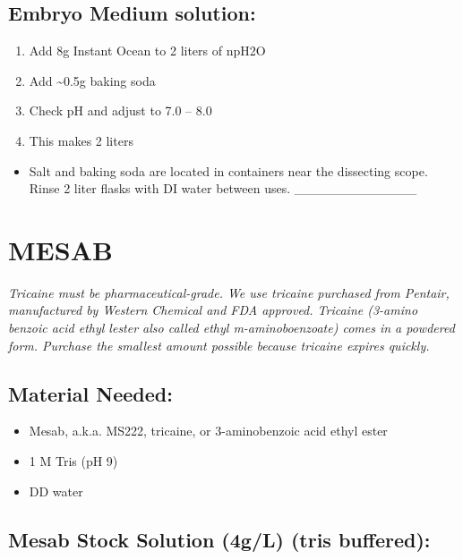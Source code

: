 \documentclass[
]{book}
\providecommand{\tightlist}{%
  \setlength{\itemsep}{0pt}\setlength{\parskip}{0pt}}
\begin{document}
\hypertarget{embryo-medium-solution}{%
\subsection{Embryo Medium solution:}\label{embryo-medium-solution}}

\begin{enumerate}
\def\labelenumi{\arabic{enumi}.}
\tightlist
\item
  Add 8g Instant Ocean to 2 liters of npH2O
\item
  Add \textasciitilde0.5g baking soda
\item
  Check pH and adjust to 7.0 -- 8.0
\item
  This makes 2 liters
\end{enumerate}

\begin{itemize}
\tightlist
\item
  Salt and baking soda are located in containers near the dissecting scope. Rinse 2 liter flasks with DI water between uses.
  \_\_\_\_\_\_\_\_\_\_\_\_\_
\end{itemize}

\hypertarget{mesab}{%
\section{MESAB}\label{mesab}}

\emph{Tricaine must be pharmaceutical-grade. We use tricaine purchased from Pentair, manufactured by Western Chemical and FDA approved. Tricaine (3-amino benzoic acid ethyl lester also called ethyl m-aminoboenzoate) comes in a powdered form. Purchase the smallest amount possible because tricaine expires quickly.}

\hypertarget{material-needed-1}{%
\subsection{Material Needed:}\label{material-needed-1}}

\begin{itemize}
\tightlist
\item
  Mesab, a.k.a. MS222, tricaine, or 3-aminobenzoic acid ethyl ester
\item
  1 M Tris (pH 9)
\item
  DD water
\end{itemize}

\hypertarget{mesab-stock-solution-4gl-tris-buffered}{%
\subsection{Mesab Stock Solution (4g/L) (tris buffered):}\label{mesab-stock-solution-4gl-tris-buffered}}
\end{document}
